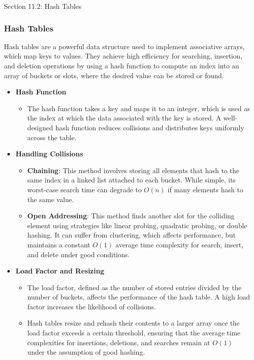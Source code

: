 \begin{notes}{Section 11.2: Hash Tables}
    \subsubsection*{Hash Tables}

    Hash tables are a powerful data structure used to implement associative arrays, which map keys to values. They achieve high efficiency for searching, insertion, and deletion operations by using a 
    hash function to compute an index into an array of buckets or slots, where the desired value can be stored or found.
    
    \begin{itemize}
        \item \textbf{Hash Function}
        \begin{itemize}
            \item The hash function takes a key and maps it to an integer, which is used as the index at which the data associated with the key is stored. A well-designed hash function reduces collisions 
            and distributes keys uniformly across the table.
        \end{itemize}
        
        \item \textbf{Handling Collisions}
        \begin{itemize}
            \item \textbf{Chaining}: This method involves storing all elements that hash to the same index in a linked list attached to each bucket. While simple, its worst-case search time can degrade 
            to $O(n)$ if many elements hash to the same value.
            \item \textbf{Open Addressing}: This method finds another slot for the colliding element using strategies like linear probing, quadratic probing, or double hashing. It can suffer from clustering, 
            which affects performance, but maintains a constant $O(1)$ average time complexity for search, insert, and delete under good conditions.
        \end{itemize}
        
        \item \textbf{Load Factor and Resizing}
        \begin{itemize}
            \item The load factor, defined as the number of stored entries divided by the number of buckets, affects the performance of the hash table. A high load factor increases the likelihood of 
            collisions.
            \item Hash tables resize and rehash their contents to a larger array once the load factor exceeds a certain threshold, ensuring that the average time complexities for insertions, deletions, 
            and searches remain at $O(1)$ under the assumption of good hashing.
        \end{itemize}
        

\end{itemize}
\end{notes}
